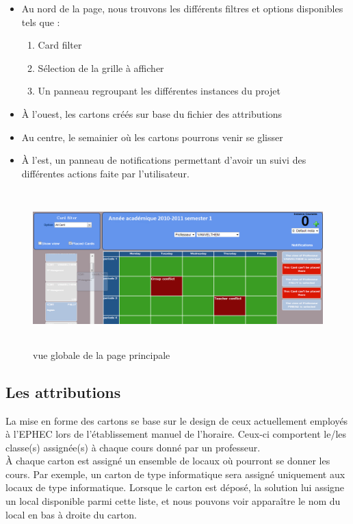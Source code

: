 \begin{itemize}	
	
	\item Au nord de la page, nous trouvons les différents filtres et options disponibles tels que :
	\begin{enumerate}
		\item Card filter
		\item Sélection de la grille à afficher
		\item Un panneau regroupant les différentes instances du projet\\
	\end{enumerate}
	\item À l'ouest, les cartons créés sur base du fichier des attributions\\
	\item Au centre, le semainier où les cartons pourrons venir se glisser\\
	\item À l'est, un panneau de notifications permettant d'avoir un suivi des différentes actions faite par l'utilisateur.
\end{itemize}

\begin{figure}[!h]
	\begin{center}
	\includegraphics[width=16cm,height=6cm]{littlemain.png}	
	\caption{vue globale de la page principale}
\end{center}
\end{figure}

\subsection{Les attributions}
La mise en forme des cartons se base sur le design de ceux actuellement employés à l'EPHEC lors de l'établissement manuel de l'horaire. Ceux-ci comportent le/les classe(s) assignée(s) à chaque cours donné par un professeur.\\
\newline
\indent
À chaque carton est assigné un ensemble de locaux où pourront se donner les cours. Par exemple, un carton de type informatique sera assigné uniquement aux locaux de type informatique. Lorsque le carton est déposé, la solution lui assigne un local disponible parmi cette liste, et nous pouvons voir apparaître le nom du local en bas à droite du carton.

